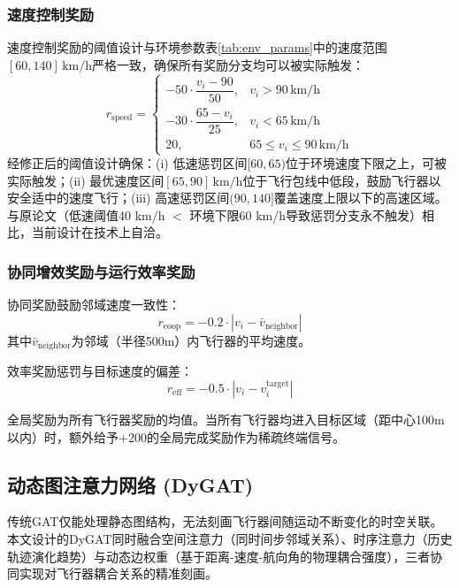 \documentclass[12pt,a4paper,UTF8]{ctexart}
\begin{document}
\subsubsection{速度控制奖励}

速度控制奖励的阈值设计与环境参数表\ref{tab:env_params}中的速度范围$[60, 140]\,\text{km/h}$严格一致，确保所有奖励分支均可以被实际触发：
\begin{equation}
    r_{\text{speed}} =
    \begin{cases}
        -50 \cdot \dfrac{v_i - 90}{50}, & v_i > 90\,\text{km/h} \\[8pt]
        -30 \cdot \dfrac{65 - v_i}{25}, & v_i < 65\,\text{km/h} \\[8pt]
        20, & 65 \leq v_i \leq 90\,\text{km/h}
    \end{cases}
    \label{eq:rspeed}
\end{equation}
经修正后的阈值设计确保：(i) 低速惩罚区间$[60, 65)$位于环境速度下限之上，可被实际触发；(ii) 最优速度区间$[65, 90]\,\text{km/h}$位于飞行包线中低段，鼓励飞行器以安全适中的速度飞行；(iii) 高速惩罚区间$(90, 140]$覆盖速度上限以下的高速区域。与原论文（低速阈值40 km/h $<$ 环境下限60 km/h导致惩罚分支永不触发）相比，当前设计在技术上自洽。

\subsubsection{协同增效奖励与运行效率奖励}

协同奖励鼓励邻域速度一致性：
\begin{equation}
    r_{\text{coop}} = -0.2 \cdot |v_i - \bar{v}_{\text{neighbor}}|
    \label{eq:rcoop}
\end{equation}
其中$\bar{v}_{\text{neighbor}}$为邻域（半径500m）内飞行器的平均速度。

效率奖励惩罚与目标速度的偏差：
\begin{equation}
    r_{\text{eff}} = -0.5 \cdot |v_i - v_i^{\text{target}}|
    \label{eq:reff}
\end{equation}

全局奖励为所有飞行器奖励的均值。当所有飞行器均进入目标区域（距中心100m以内）时，额外给予$+200$的全局完成奖励作为稀疏终端信号。

\subsection{动态图注意力网络 (DyGAT)}

传统GAT仅能处理静态图结构，无法刻画飞行器间随运动不断变化的时空关联。本文设计的DyGAT同时融合空间注意力（同时间步邻域关系）、时序注意力（历史轨迹演化趋势）与动态边权重（基于距离-速度-航向角的物理耦合强度），三者协同实现对飞行器耦合关系的精准刻画。
\end{document}
